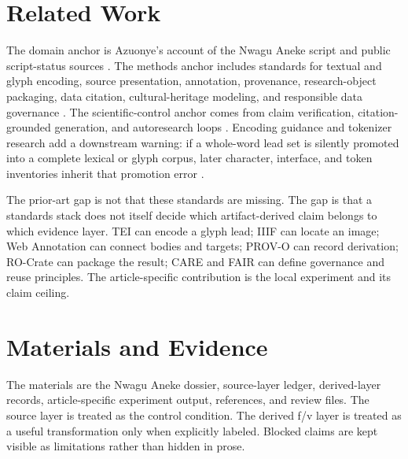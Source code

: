 \documentclass[sigconf,nonacm]{acmart}
\begin{document}
\section{Related Work}
The domain anchor is Azuonye's account of the Nwagu Aneke script and public
script-status sources \cite{azuonye1992,omniglotNwagu,unicodeAfricanScripts2023,scriptSourceNwagu,sirisNwaguProposal}.
The methods anchor includes standards for textual and glyph encoding, source
presentation, annotation, provenance, research-object packaging, data citation,
cultural-heritage modeling, and responsible data governance \cite{azuonye1992,omniglotNwagu,unicodeAfricanScripts2023,scriptSourceNwagu,sirisNwaguProposal,teiP5Glyphs,iiifPresentation3,w3cAnnotationModel,w3cAnnotationVocab,w3cProvO,rocrate12,cidocCrm,datacite45,wilkinson2016fair,carroll2020care,wadden2020scifact,gao2023alce,karpathyAutoresearch,acmSubmissions,arxivSubmitTex}.
The scientific-control anchor comes from claim verification, citation-grounded
generation, and autoresearch loops \cite{wadden2020scifact,gao2023alce,karpathyAutoresearch}.
Encoding guidance and tokenizer research add a downstream warning: if a
whole-word lead set is silently promoted into a complete lexical or glyph
corpus, later character, interface, and token inventories inherit that promotion
error \cite{seiProposalTips,sennrich2016bpe,kudo2018sentencepiece,bostrom2020bytepair,rust2021tokenization}.

The prior-art gap is not that these standards are missing. The gap is that a
standards stack does not itself decide which artifact-derived claim belongs to
which evidence layer. TEI can encode a glyph lead; IIIF can locate an image;
Web Annotation can connect bodies and targets; PROV-O can record derivation;
RO-Crate can package the result; CARE and FAIR can define governance and reuse
principles. The article-specific contribution is the local experiment and its
claim ceiling.

\section{Materials and Evidence}
The materials are the Nwagu Aneke dossier, source-layer ledger, derived-layer
records, article-specific experiment output, references, and review files.
The source layer is treated as the control condition. The derived f/v layer is
treated as a useful transformation only when explicitly labeled. Blocked claims
are kept visible as limitations rather than hidden in prose.
\end{document}
